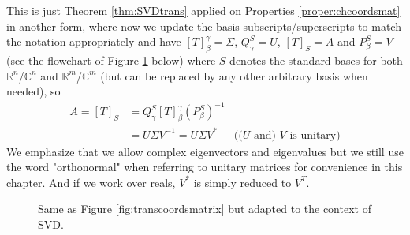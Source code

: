 This is just Theorem \ref{thm:SVDtrans} applied on Properties \ref{proper:chcoordsmat} in another form, where now we update the basis subscripts/superscripts to match the notation appropriately and have $[T]^{\gamma}_{\beta} = \Sigma$, $Q_{\gamma}^{S} = U$, $[T]_{S} = A$ and $P_{\beta}^{S} = V$ (see the flowchart of Figure \ref{fig:transcoordSVD} below) where $S$ denotes the standard bases for both $\mathbb{R}^n$/$\mathbb{C}^n$ and $\mathbb{R}^m$/$\mathbb{C}^m$ (but can be replaced by any other arbitrary basis when needed), so
\begin{align*}
A = [T]_S &= Q_{\gamma}^{S}[T]^{\gamma}_{\beta}(P_{\beta}^{S})^{-1} \\
&= U\Sigma V^{-1} = U\Sigma V^* & \text{(($U$ and) $V$ is unitary)}
\end{align*}
We emphasize that we allow complex eigenvectors and eigenvalues but we still use the word "orthonormal" when referring to unitary matrices for convenience in this chapter. And if we work over reals, $V^*$ is simply reduced to $V^T$.

\begin{figure}
    \centering
    \caption{Same as Figure \ref{fig:transcoordsmatrix} but adapted to the context of SVD.}
    \label{fig:transcoordSVD}
\end{figure}

